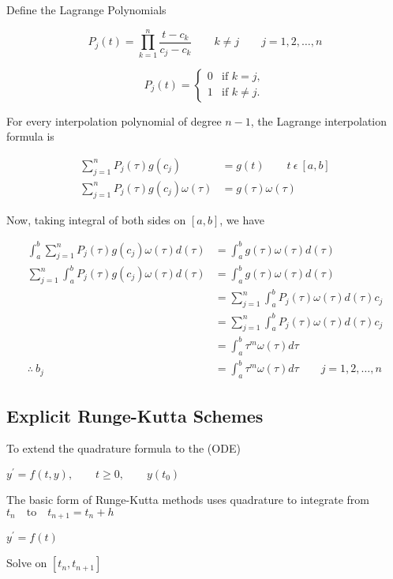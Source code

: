 \documentclass[12pt,a4paper]{article}
\begin{document}
\noindent
Define the Lagrange Polynomials

$$P_j(t) = \prod_{k=1}^n \frac{t - c_k }{c_j - c_k } \qquad k\neq j  \qquad j = 1,2, \ldots , n$$

\[
P_j(t) =
\begin{cases}
0
& \text{if } k = j,\\
1 & \text{if } k \neq j.
\end{cases}
\]

\noindent
For every interpolation polynomial of degree $n-1$, the Lagrange interpolation formula is 

\begin{align*}
\sum_{j=1}^n P_j(\tau)g(c_j) &= g(t)  \qquad t \: \epsilon \: [a,b] \\
\sum_{j=1}^n P_j(\tau)g(c_j) \omega(\tau)  &=  g(\tau)\omega(\tau) 
\end{align*}

\noindent
Now, taking integral of both sides on $ [a,b] $, we have

\begin{align*}
\int_a^b \sum_{j=1}^n P_j(\tau)g(c_j) \omega(\tau) d(\tau)  &=  \int_a^b g(\tau)\omega(\tau) d(\tau) \\
\sum_{j=1}^n \int_a^b P_j(\tau)g(c_j) \omega(\tau) d(\tau)  &=  \int_a^b g(\tau)\omega(\tau) d(\tau) \\
&= \sum_{j=1}^n \int_a^b P_j(\tau)\omega(\tau) d(\tau)c_j \\ 
&=\sum_{j=1}^n \int_a^b P_j(\tau)\omega(\tau) d(\tau)c_j \\
&= \int_a^b \tau^m \omega(\tau)d\tau \\
\therefore \: b_j &= \int_a^b \tau^m \omega(\tau)d\tau   \qquad j = 1,2,\ldots , n
\end{align*}

\subsection{Explicit Runge-Kutta Schemes}

To extend the quadrature formula to the (ODE) 

$ y^\prime = f ( t,y ) , \qquad t\geq 0, \qquad y( t_0) $

\vspace{3pt}
\noindent
The basic form of Runge-Kutta methods uses quadrature to integrate from $ t_n \quad  \text{to} \quad t_{n+1} = t_n + h $

$ y^\prime = f(t) $

\noindent
Solve on $ [t_n , t_{n+1} ] $
\end{document}
